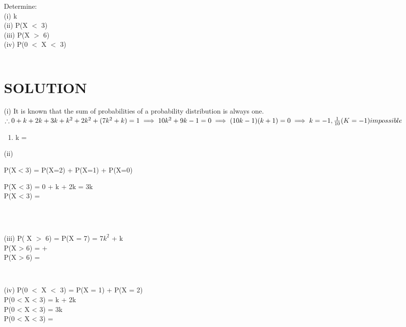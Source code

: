 \documentclass[l1pt,a4paper,two column]{article}
\begin{document}
\begin{enumerate}
    


Determine: \\
(i)   k \\
(ii)  P(X $<$ 3) \\
(iii) P(X $>$ 6)  \\
(iv)  P(0 $<$ X $<$ 3) \\
\\
\section{SOLUTION}
(i)
It is known that the sum of probabilities of a probability distribution is always one. \\


    

$
 \therefore 0 + k + 2k + 3k + k^2 + 2k^2 + (7k^2 + k) = 1 
 \\
 \implies 10k^2 + 9k - 1 = 0 \\
 \implies  (10k - 1)(k + 1) = 0 \\
 \implies  k = -1, \frac{1}{10} \\
  (K = -1) \\
  impossible
  $
  \\
  \begin{enumerate}
      \item \therefore k = 
  \end{enumerate}
 \begin{enumerate}
(ii)

    P(X$<$3) = P(X=2) + P(X=1) + P(X=0)

      \implies  P(X < 3) = 0 + k + 2k = 3k \\
      \therefore  P(X < 3) =  
      \end{enumerate}
 \\
\begin{enumerate}
    \\
(iii)
P( X $>$ 6) = P(X = 7) = 7$k^2$ + k \\
\implies  P(X > 6)  =  +  \\
          \therefore P(X > 6) =  
\end{enumerate}
\\
\begin{enumerate}

(iv)
 P(0 $<$ X $<$ 3) = P(X = 1) + P(X = 2)  \\
\implies   P(0 < X < 3) = k + 2k \\
\implies   P(0 < X < 3) = 3k \\
    \therefore    P(0 < X < 3) =  
\end{enumerate}

\end{enumerate}
\end{document}
